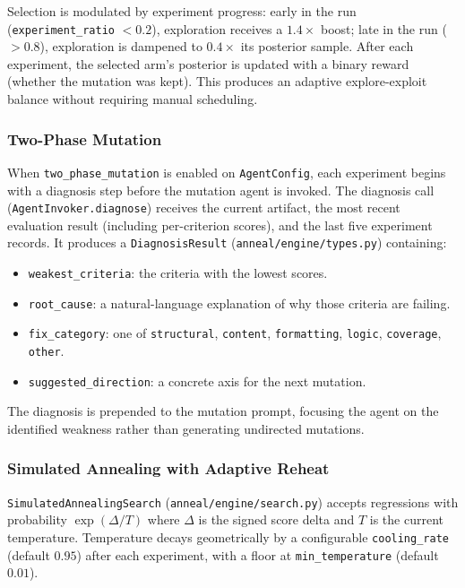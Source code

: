 Selection is modulated by experiment progress: early in the run (\texttt{experiment\_ratio} $< 0.2$), exploration receives a $1.4\times$ boost; late in the run ($> 0.8$), exploration is dampened to $0.4\times$ its posterior sample.
After each experiment, the selected arm's posterior is updated with a binary reward (whether the mutation was kept).
This produces an adaptive explore-exploit balance without requiring manual scheduling.

\subsubsection{Two-Phase Mutation}\label{sec:two-phase}

When \texttt{two\_phase\_mutation} is enabled on \texttt{AgentConfig}, each experiment begins with a diagnosis step before the mutation agent is invoked.
The diagnosis call (\texttt{AgentInvoker.diagnose}) receives the current artifact, the most recent evaluation result (including per-criterion scores), and the last five experiment records.
It produces a \texttt{DiagnosisResult} (\texttt{anneal/engine/types.py}) containing:
\begin{itemize}
    \item \texttt{weakest\_criteria}: the criteria with the lowest scores.
    \item \texttt{root\_cause}: a natural-language explanation of why those criteria are failing.
    \item \texttt{fix\_category}: one of \texttt{structural}, \texttt{content}, \texttt{formatting}, \texttt{logic}, \texttt{coverage}, \texttt{other}.
    \item \texttt{suggested\_direction}: a concrete axis for the next mutation.
\end{itemize}
The diagnosis is prepended to the mutation prompt, focusing the agent on the identified weakness rather than generating undirected mutations.

\subsubsection{Simulated Annealing with Adaptive Reheat}\label{sec:simulated-annealing}

\texttt{SimulatedAnnealingSearch} (\texttt{anneal/engine/search.py}) accepts regressions with probability $\exp(\Delta / T)$ where $\Delta$ is the signed score delta and $T$ is the current temperature.
Temperature decays geometrically by a configurable \texttt{cooling\_rate} (default $0.95$) after each experiment, with a floor at \texttt{min\_temperature} (default $0.01$).

